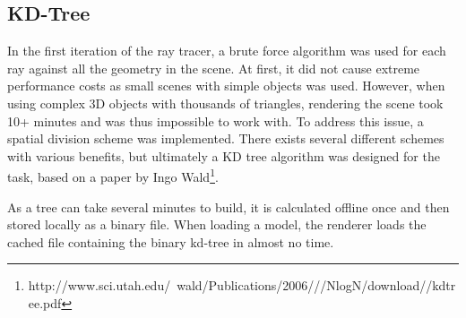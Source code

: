\subsection{KD-Tree}
In the first iteration of the ray tracer, a brute force algorithm was used for each ray against all the geometry in the scene. At first, it did not cause extreme performance costs as small scenes with simple objects was used. However, when using complex 3D objects with thousands of triangles, rendering the scene took 10+ minutes and was thus impossible to work with. To address this issue, a spatial division scheme was implemented. There exists several different schemes with various benefits, but ultimately a KD tree algorithm was designed for the task, based on a paper by Ingo Wald\footnote{http://www.sci.utah.edu/~wald/Publications/2006///NlogN/download//kdtree.pdf}. 

As a tree can take several minutes to build, it is calculated offline once and then stored locally as a binary file. When loading a model, the renderer loads the cached file containing the binary kd-tree in almost no time.

